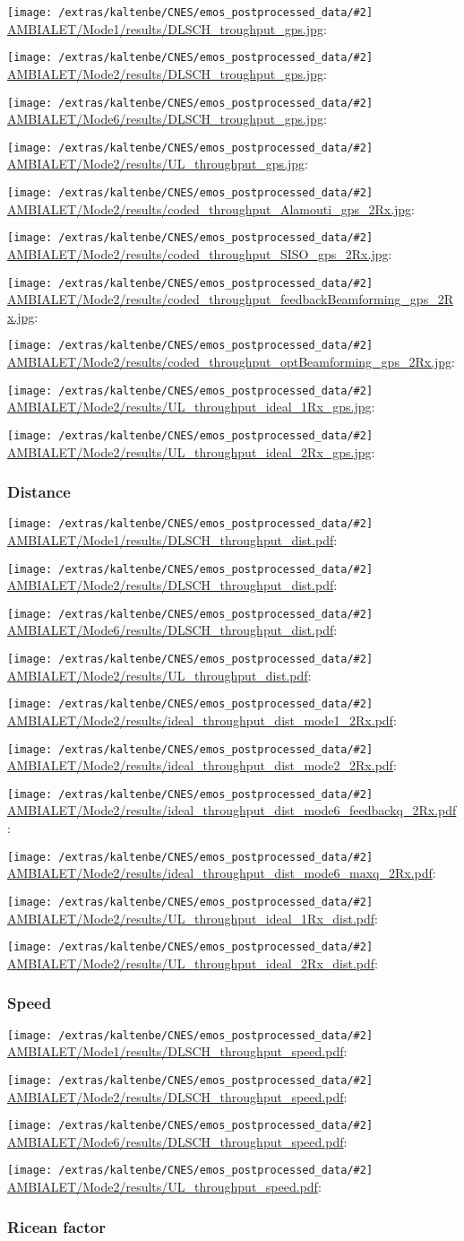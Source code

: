\documentclass[a4paper,10pt]{article}
\newcommand{\printfile}[2][]{
 \begin{minipage}{8cm}
  \centering
  \texttt{[image: /extras/kaltenbe/CNES/emos\_postprocessed\_data/\#2]}
  \url{#2}: #1

 \end{minipage}
}
\begin{document}
\printfile{AMBIALET/Mode1/results/DLSCH_troughput_gps.jpg}
\printfile{AMBIALET/Mode2/results/DLSCH_troughput_gps.jpg}

\printfile{AMBIALET/Mode6/results/DLSCH_troughput_gps.jpg}
\printfile{AMBIALET/Mode2/results/UL_throughput_gps.jpg}

\printfile{AMBIALET/Mode2/results/coded_throughput_Alamouti_gps_2Rx.jpg}
\printfile{AMBIALET/Mode2/results/coded_throughput_SISO_gps_2Rx.jpg}

\printfile{AMBIALET/Mode2/results/coded_throughput_feedbackBeamforming_gps_2Rx.jpg}
\printfile{AMBIALET/Mode2/results/coded_throughput_optBeamforming_gps_2Rx.jpg}

\printfile{AMBIALET/Mode2/results/UL_throughput_ideal_1Rx_gps.jpg}
\printfile{AMBIALET/Mode2/results/UL_throughput_ideal_2Rx_gps.jpg}

\subsubsection{Distance}

\printfile{AMBIALET/Mode1/results/DLSCH_throughput_dist.pdf}
\printfile{AMBIALET/Mode2/results/DLSCH_throughput_dist.pdf}

\printfile{AMBIALET/Mode6/results/DLSCH_throughput_dist.pdf}
\printfile{AMBIALET/Mode2/results/UL_throughput_dist.pdf}

\printfile{AMBIALET/Mode2/results/ideal_throughput_dist_mode1_2Rx.pdf}
\printfile{AMBIALET/Mode2/results/ideal_throughput_dist_mode2_2Rx.pdf}

\printfile{AMBIALET/Mode2/results/ideal_throughput_dist_mode6_feedbackq_2Rx.pdf}
\printfile{AMBIALET/Mode2/results/ideal_throughput_dist_mode6_maxq_2Rx.pdf}

\printfile{AMBIALET/Mode2/results/UL_throughput_ideal_1Rx_dist.pdf}
\printfile{AMBIALET/Mode2/results/UL_throughput_ideal_2Rx_dist.pdf}

\subsubsection{Speed}

\printfile{AMBIALET/Mode1/results/DLSCH_throughput_speed.pdf}
\printfile{AMBIALET/Mode2/results/DLSCH_throughput_speed.pdf}

\printfile{AMBIALET/Mode6/results/DLSCH_throughput_speed.pdf}
\printfile{AMBIALET/Mode2/results/UL_throughput_speed.pdf}

\subsubsection{Ricean factor}
\end{document}

